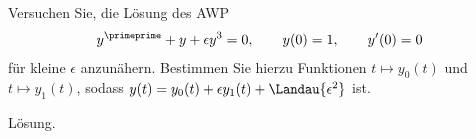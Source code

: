 \begin{exercise}
Versuchen Sie, die Lösung des AWP
\begin{align*}
  y^{\primeprime} + y + \epsilon y^3 = 0, \qquad y(0) = 1, \qquad y^{\prime}(0) = 0
\end{align*}
für kleine $\epsilon$ anzunähern. Bestimmen Sie hierzu Funktionen $t \mapsto y_0(t)$
und $t \mapsto y_1(t)$, sodass $y(t) = y_0(t) + \epsilon y_1(t) + \Landau{\epsilon^2}$ ist.
\end{exercise}
\begin{solution}
Lösung.
\end{solution}
